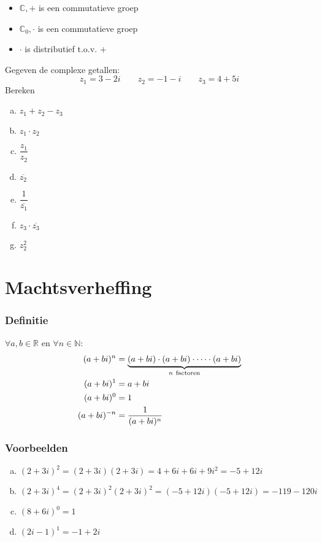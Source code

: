 \documentclass[12pt,twoside,a4paper]{article}
\begin{document}
\begin{itemize}
  \item $\mathbb{C},+$ is een commutatieve groep
  \item $\mathbb{C}_0,\cdot$ is een commutatieve groep
  \item $\cdot$ is distributief t.o.v. $+$
\end{itemize}

\begin{oefening}
  Gegeven de complexe getallen:
  $$z_1=3-2i \qquad z_2=-1-i \qquad z_3=4+5i$$
  Bereken
  \begin{multicols}{2}
    \begin{enumerate}[(a)]
      \itemsep 1em
    \item $\displaystyle z_1+z_2-z_3$
    \item $\displaystyle z_1\cdot z_2$
    \item $\displaystyle \dfrac{z_1}{z_2}$
    \item $\displaystyle \overline{z_2}$
    \item $\displaystyle \dfrac{1}{\overline{z_1}}$
    \item $\displaystyle z_3\cdot \overline{z_3}$
    \item $\displaystyle z_2^2$
    \end{enumerate}
  \end{multicols}
\end{oefening}

\cleardoublepage
\section{Machtsverheffing}

\subsubsection*{Definitie}
\begin{mdframed}
  $\forall a,b\in\mathbb{R}$ en $\forall n\in\mathbb{N}$:
  \begin{align*}
    (a+bi)^n &= \underbrace{(a+bi)\cdot(a+bi)\cdot\cdots\cdot(a+bi)}_{n\mbox{ \scriptsize factoren}}\\
    (a+bi)^1 &= a+bi\\
    (a+bi)^0 &= 1\\
    (a+bi)^{-n} &= \dfrac{1}{(a+bi)^{n}}
  \end{align*}
\end{mdframed}

\subsubsection*{Voorbeelden}
\begin{enumerate}[(a)]
  \item $(2+3i)^2=(2+3i)(2+3i)=4+6i+6i+9i^2=-5+12i$
  \item $(2+3i)^4=(2+3i)^2(2+3i)^2=(-5+12i)(-5+12i)=-119-120i$
  \item $(8+6i)^0=1$
  \item $(2i-1)^1=-1+2i$
\end{enumerate}
\end{document}
